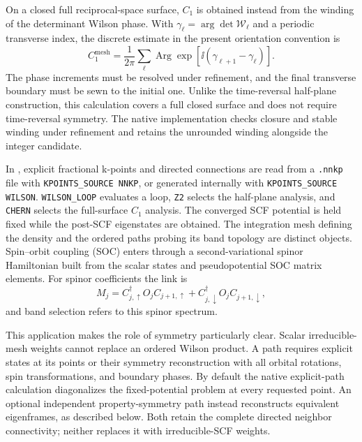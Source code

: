 On a closed full reciprocal-space surface, $C_1$ is obtained instead from
the winding of the determinant Wilson phase. With
$\gamma_\ell=\arg\det\mathcal W_\ell$ and a periodic transverse index,
the discrete estimate in the present orientation convention is
\begin{equation}
 C_1^{\mathrm{mesh}}=\frac{1}{2\pi}\sum_\ell
 \operatorname{Arg}\exp\!\left[\ii(\gamma_{\ell+1}-\gamma_\ell)\right].
 \label{eq:topology-c1}
\end{equation}
The phase increments must be resolved under refinement, and the final
transverse boundary must be sewn to the initial one. Unlike the
time-reversal half-plane construction, this calculation covers a full
closed surface and does not require time-reversal symmetry. The native
implementation checks closure and stable winding under refinement and
retains the unrounded winding alongside the integer candidate.

In \CPtwoK{}, explicit fractional k-points and directed connections are
read from a \texttt{.nnkp} file with \texttt{KPOINTS\_SOURCE NNKP}, or
generated internally with \texttt{KPOINTS\_SOURCE WILSON}.
\texttt{WILSON\_LOOP} evaluates a loop, \texttt{Z2} selects the
half-plane analysis, and \texttt{CHERN} selects the full-surface $C_1$
analysis. The converged SCF potential is held fixed while the
post-SCF eigenstates are obtained. The integration mesh defining the density
and the ordered paths probing its band topology are distinct objects.
Spin--orbit coupling (SOC) enters through a second-variational spinor
Hamiltonian built from the scalar states and pseudopotential SOC matrix
elements. For spinor coefficients the link is
\begin{equation}
 M_j=C_{j,\uparrow}^\dagger O_jC_{j+1,\uparrow}
       +C_{j,\downarrow}^\dagger O_jC_{j+1,\downarrow},
 \label{eq:topology-spinors}
\end{equation}
and band selection refers to this spinor spectrum.

This application makes the role of symmetry particularly clear. Scalar
irreducible-mesh weights cannot replace an ordered Wilson product. A path
requires explicit states at its points or their symmetry reconstruction
with all orbital rotations, spin transformations, and boundary phases.
By default the native explicit-path calculation diagonalizes the
fixed-potential problem at every requested point. An optional independent
property-symmetry path instead reconstructs equivalent eigenframes, as
described below. Both retain the complete directed neighbor connectivity;
neither replaces it with irreducible-SCF weights.

